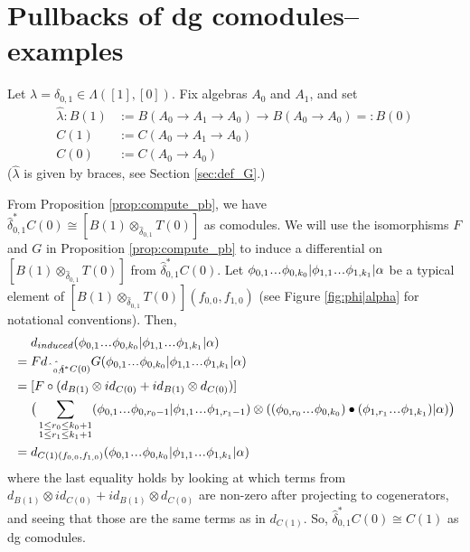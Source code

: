 \section{Pullbacks of dg comodules--examples}
%
\begin{eg} \label{eg:pb}
Let $\lambda = \delta_{0,1} \in \Lambda([1], [0])$. 
Fix algebras $A_0$ and $A_1$, and set 
\begin{align*}
\hat{\lambda}: B(1) 
&:= B(A_0 \to A_1 \to A_0) \to 
  B(A_0 \to A_0) =: B(0)\\
C(1) 
&:= C(A_0 \to A_1 \to A_0)\\
C(0) 
&:= C(A_0 \to A_0)
\end{align*}
($\hat{\lambda}$ is given by braces, 
see Section \ref{sec:def_G}.)

From Proposition \ref{prop:compute_pb}, we 
have $\hat{\delta}_{0,1}^* C(0) \cong
[B(1) \otimes_{\hat{\delta}_{0,1}} T(0)]$ 
as comodules. We will use the isomorphisms 
$F$ and $G$ in Proposition \ref{prop:compute_pb} 
to induce a differential on 
$[B(1) \otimes_{\hat{\delta}_{0,1}} T(0)]$ 
from $\hat{\delta}_{0,1}^* C(0)$.
Let 
$\phi_{0,1} \smdots \phi_{0,k_0} |
\phi_{1,1} \smdots \phi_{1,k_1} |
\alpha$ be a typical element of 
$[B(1) \otimes_{\hat{\delta}_{0,1}} 
  T(0)](f_{0,0},f_{1,0})$
(see Figure \ref{fig:phi|alpha} for 
notational conventions). Then,
\begin{align*}
& \phantom{{}={}}
d_{induced}
(\phi_{0,1} \smdots \phi_{0,k_0} |
\phi_{1,1} \smdots \phi_{1,k_1} |\alpha)\\
&=
Fd_{\hat{\hat{\delta}_{0,1}}^*C(0)}G
(\phi_{0,1} \smdots \phi_{0,k_0} |
\phi_{1,1} \smdots \phi_{1,k_1} |\alpha) \\
&=
[F \circ (d_{B(1)}\otimes id_{C(0)} + 
  id_{B(1)} \otimes d_{C(0)})] \\
& \phantom{{}=  {}}
\big( \sum \limits_{\substack{1 \leq r_0 \leq k_0+1 \\ 
1 \leq r_1 \leq k_1+1}}
(\phi_{0,1} \smdots \phi_{0,r_0-1} |
\phi_{1,1} \smdots \phi_{1,r_1-1} ) \otimes 
((\phi_{0,r_0}\smdots \phi_{0,k_0}) \bullet 
(\phi_{1,r_1}\smdots \phi_{1,k_1}) |\alpha) \big) \\
&= 
d_{C(1)(f_{0,0},f_{1,0})}
(\phi_{0,1} \smdots \phi_{0,k_0} |
\phi_{1,1} \smdots \phi_{1,k_1} |\alpha)
\end{align*}
where the last equality holds by looking at which 
terms from $d_{B(1)}\otimes id_{C(0)} + 
id_{B(1)} \otimes d_{C(0)}$ 
are non-zero after projecting to cogenerators, and 
seeing that those are the same terms as in 
$d_{C(1)}$. So, $\hat{\delta}_{0,1}^*C(0) \cong C(1)$ as 
dg comodules. 
\end{eg}
